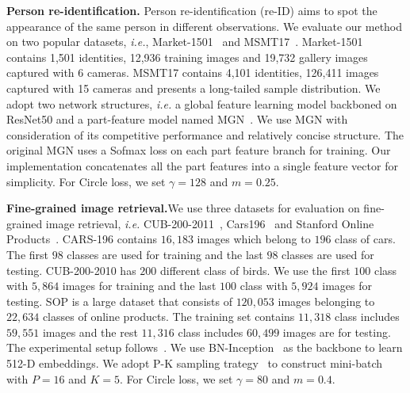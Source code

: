 \documentclass[10pt,twocolumn,letterpaper]{article}
\begin{document}
\textbf{Person re-identification.}\quad 
Person re-identification (re-ID) aims to spot the appearance of the same person in different observations. %
We evaluate our method on two popular datasets, \emph{i.e.}, Market-1501~\cite{Zheng_2015_ICCVmarket} and MSMT17~\cite{Wei_2018_CVPRMSMT17}. Market-1501 contains 1,501 identities, 12,936 training images and 19,732 gallery images captured with 6 cameras. MSMT17 contains 4,101 identities, 126,411 images captured with 15 cameras and presents a long-tailed sample distribution. We adopt two network structures, \emph{i.e.} a global feature learning model backboned on ResNet50 and a part-feature model named MGN~\cite{Wang_2018MGN}. We use MGN with consideration of its competitive performance and relatively concise structure. The original MGN uses a Sofmax loss on each part feature branch for training. Our implementation concatenates all the part features into a single feature vector for simplicity. For Circle loss, we set $\gamma=128$ and $m=0.25$.




\textbf{Fine-grained image retrieval.}\quad We use three datasets for evaluation on fine-grained image retrieval, \textit{i.e.} CUB-200-2011~\cite{WahCUB_200_2011}, Cars196~\cite{krause20133d} and Stanford Online Products~\cite{oh2016deep}. 
CARS-196 contains $16,183$ images which belong to $196$ class of cars. The first $98$ classes are used for training and the last $98$ classes are used for testing. CUB-200-2010 has $200$ different class of birds. We use the first $100$ class with $5,864$ images for training and the last $100$ class with $5,924$ images for testing. SOP is a large dataset that consists of $120,053$ images belonging to $22,634$ classes of online products. The training set contains $11,318$ class includes $59,551$ images and the rest $11,316$ class includes $60,499$ images are for testing.
The experimental setup follows~\cite{oh2016deep}. We use BN-Inception~\cite{ioffe2015batch} as the backbone to learn 512-D embeddings. We adopt P-K sampling trategy~\cite{hermans2017defense} to construct mini-batch with $P=16$ and $K=5$. 
For Circle loss, we set $\gamma=80$ and $m=0.4$.
\end{document}
